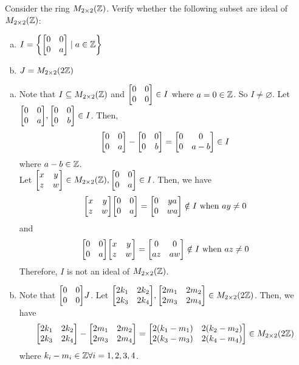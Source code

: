\begin{exercise}
    Consider the ring $M_{2 \times 2} (\mathbb{Z})$. Verify whether the following subset are ideal of $M_{2 \times 2} (\mathbb{Z})$:
    \begin{enumerate}[(a)]
        \item $I = \qty{\mqty[0 & 0 \\ 0 & a] \mid a \in \Z}$
        \item $J = M_{2 \times 2} (2\mathbb{Z})$
    \end{enumerate}
\end{exercise}

\begin{solution} \phantom{blank}
\begin{enumerate}[(a)]
    \item     Note that $I \subseteq M_{2 \times 2} (\mathbb{Z})$ and $\mqty[0 & 0 \\ 0 & 0 ] \in I$ where $a = 0 \in \mathbb{Z}$. So $I \neq \varnothing$. Let $\mqty[0 & 0 \\ 0 & a ], \mqty[0 & 0 \\ 0 & b ] \in I$. Then,
    \[ \mqty[0 & 0 \\ 0 & a ] - \mqty[0 & 0 \\ 0 & b ] = \mqty[0 & 0 \\ 0 & a - b ] \in I \]
    where $a - b \in \mathbb{Z}$. \\
    
    Let $\mqty[x & y \\ z & w ] \in M_{2 \times 2} (\Z), \mqty[0 & 0 \\ 0 & a ] \in I$. Then, we have
    \[ \mqty[x & y \\ z & w ] \mqty[0 & 0 \\ 0 & a ] = \mqty[0 & ya \\ 0 & wa ] \notin I \text{ when 
    } ay \neq 0 \]
    and
    \[ \mqty[0 & 0 \\ 0 & a ] \mqty[x & y \\ z & w ]  = \mqty[0 & 0 \\ az & aw ] \notin I \text{ when 
    } az \neq 0 \]
    Therefore, $I$ is not an ideal of $M_{2 \times  2} (\mathbb{Z})$. 
    \item Note that $\mqty[0 & 0 \\ 0 & 0 ] J$. Let $\mqty[2k_1 & 2k_2 \\ 2k_3 & 2k_4 ], \mqty[2m_1 & 2m_2 \\ 2m_3 & 2m_4 ] \in M_{2 \times 2} (2\Z)$. Then, we have
    \[\mqty[2k_1 & 2k_2 \\ 2k_3 & 2k_4 ] - \mqty[2m_1 & 2m_2 \\ 2m_3 & 2m_4 ] =  \mqty[2 (k_1 - m_1) & 2 (k_2 - m_2) \\ 2 (k_3 - m_3) & 2 (k_4 - m_4) ] \in M_{2 \times 2} (2\Z)\]
    where $k_i - m_i \in \mathbb{Z} \forall i = 1, 2, 3, 4$. \\
    

\end{enumerate}
\end{solution}
